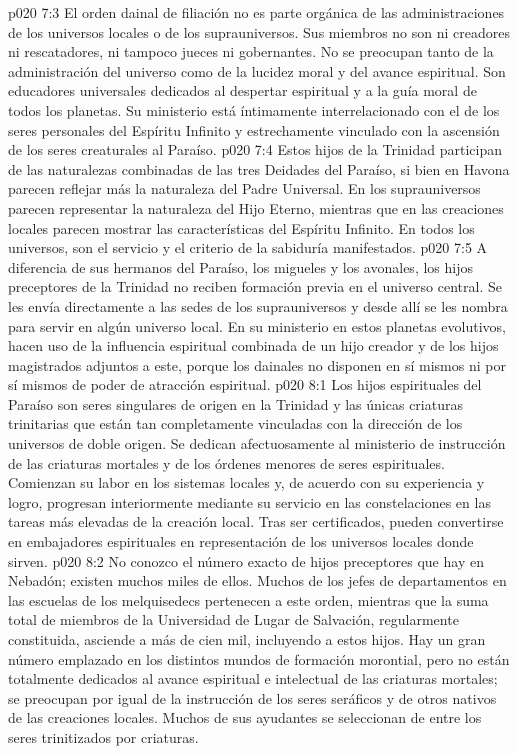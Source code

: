 \vs p020 7:3 El orden dainal de filiación no es parte orgánica de las administraciones de los universos locales o de los suprauniversos. Sus miembros no son ni creadores ni rescatadores, ni tampoco jueces ni gobernantes. No se preocupan tanto de la administración del universo como de la lucidez moral y del avance espiritual. Son educadores universales dedicados al despertar espiritual y a la guía moral de todos los planetas. Su ministerio está íntimamente interrelacionado con el de los seres personales del Espíritu Infinito y estrechamente vinculado con la ascensión de los seres creaturales al Paraíso.
\vs p020 7:4 Estos hijos de la Trinidad participan de las naturalezas combinadas de las tres Deidades del Paraíso, si bien en Havona parecen reflejar más la naturaleza del Padre Universal. En los suprauniversos parecen representar la naturaleza del Hijo Eterno, mientras que en las creaciones locales parecen mostrar las características del Espíritu Infinito. En todos los universos, son el servicio y el criterio de la sabiduría manifestados.
\vs p020 7:5 A diferencia de sus hermanos del Paraíso, los migueles y los avonales, los hijos preceptores de la Trinidad no reciben formación previa en el universo central. Se les envía directamente a las sedes de los suprauniversos y desde allí se les nombra para servir en algún universo local. En su ministerio en estos planetas evolutivos, hacen uso de la influencia espiritual combinada de un hijo creador y de los hijos magistrados adjuntos a este, porque los dainales no disponen en sí mismos ni por sí mismos de poder de atracción espiritual.
\vs p020 8:1 Los hijos espirituales del Paraíso son seres singulares de origen en la Trinidad y las únicas criaturas trinitarias que están tan completamente vinculadas con la dirección de los universos de doble origen. Se dedican afectuosamente al ministerio de instrucción de las criaturas mortales y de los órdenes menores de seres espirituales. Comienzan su labor en los sistemas locales y, de acuerdo con su experiencia y logro, progresan interiormente mediante su servicio en las constelaciones en las tareas más elevadas de la creación local. Tras ser certificados, pueden convertirse en embajadores espirituales en representación de los universos locales donde sirven.
\vs p020 8:2 No conozco el número exacto de hijos preceptores que hay en Nebadón; existen muchos miles de ellos. Muchos de los jefes de departamentos en las escuelas de los melquisedecs pertenecen a este orden, mientras que la suma total de miembros de la Universidad de Lugar de Salvación, regularmente constituida, asciende a más de cien mil, incluyendo a estos hijos. Hay un gran número emplazado en los distintos mundos de formación morontial, pero no están totalmente dedicados al avance espiritual e intelectual de las criaturas mortales; se preocupan por igual de la instrucción de los seres seráficos y de otros nativos de las creaciones locales. Muchos de sus ayudantes se seleccionan de entre los seres trinitizados por criaturas.
